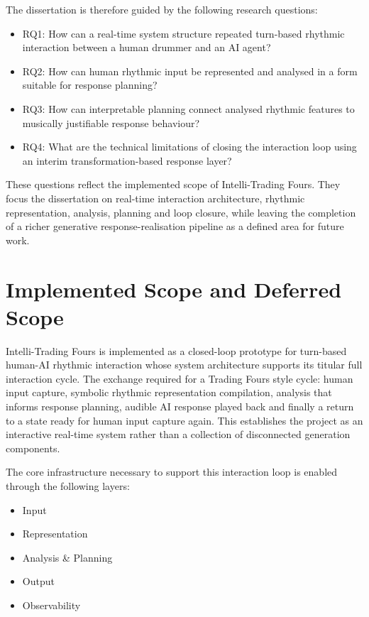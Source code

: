 The dissertation is therefore guided by the following research
questions:

\begin{itemize}
\item
  RQ1: How can a real-time system structure repeated turn-based rhythmic
  interaction between a human drummer and an AI agent?
\item
  RQ2: How can human rhythmic input be represented and analysed in a
  form suitable for response planning?
\item
  RQ3: How can interpretable planning connect analysed rhythmic features
  to musically justifiable response behaviour?
\item
  RQ4: What are the technical limitations of closing the interaction
  loop using an interim transformation-based response layer?
\end{itemize}

These questions reflect the implemented scope of Intelli-Trading Fours.
They focus the dissertation on real-time interaction architecture,
rhythmic representation, analysis, planning and loop closure, while
leaving the completion of a richer generative response-realisation
pipeline as a defined area for future work.

\section{Implemented Scope and Deferred Scope}\label{implemented-scope-and-deferred-scope}

Intelli-Trading Fours is implemented as a closed-loop prototype for
turn-based human-AI rhythmic interaction whose system architecture
supports its titular full interaction cycle. The exchange required for a
Trading Fours style cycle: human input capture, symbolic rhythmic
representation compilation, analysis that informs response planning,
audible AI response played back and finally a return to a state ready
for human input capture again. This establishes the project as an
interactive real-time system rather than a collection of disconnected
generation components.

The core infrastructure necessary to support this interaction loop is
enabled through the following layers:

\begin{itemize}
\item
  Input
\item
  Representation
\item
  Analysis \& Planning
\item
  Output
\item
  Observability
\end{itemize}

